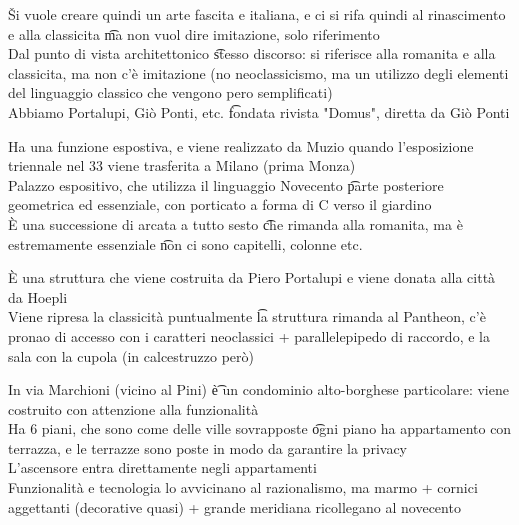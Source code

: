 \documentclass[12pt]{article}
\begin{document}
\v

Si vuole creare quindi un arte fascita e italiana, e ci si rifa quindi al rinascimento e alla classicita \t ma non vuol dire imitazione, solo riferimento \\
Dal punto di vista architettonico \t stesso discorso: si riferisce alla romanita e alla classicita, ma non c'è imitazione (no neoclassicismo, ma un utilizzo degli elementi del linguaggio classico che vengono pero semplificati) \\
Abbiamo Portalupi, Giò Ponti, etc. \t fondata rivista "Domus", diretta da Giò Ponti

Ha una funzione espostiva, e viene realizzato da Muzio quando l'esposizione triennale nel 33 viene trasferita a Milano (prima Monza) \\
Palazzo espositivo, che utilizza il linguaggio Novecento \t parte posteriore geometrica ed essenziale, con porticato a forma di C verso il giardino \\
È una successione di arcata a tutto sesto \t che rimanda alla romanita, ma è estremamente essenziale \t non ci sono capitelli, colonne etc.

È una struttura che viene costruita da Piero Portalupi e viene donata alla città da Hoepli \\
Viene ripresa la classicità puntualmente \t la struttura rimanda al Pantheon, c'è pronao di accesso con i caratteri neoclassici + parallelepipedo di raccordo, e la sala con la cupola (in calcestruzzo però)

In via Marchioni (vicino al Pini) \t è un condominio alto-borghese particolare: viene costruito con attenzione alla funzionalità \\
Ha 6 piani, che sono come delle ville sovrapposte \t ogni piano ha appartamento con terrazza, e le terrazze sono poste in modo da garantire la privacy \\
L'ascensore entra direttamente negli appartamenti \\
Funzionalità e tecnologia lo avvicinano al razionalismo, ma marmo + cornici aggettanti (decorative quasi) + grande meridiana ricollegano al novecento
\end{document}
